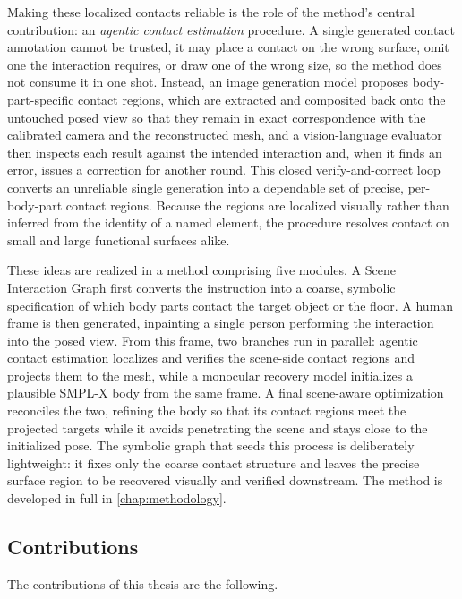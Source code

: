 Making these localized contacts reliable is the role of the method's central contribution: an \emph{agentic contact estimation} procedure. A single generated contact annotation cannot be trusted, it may place a contact on the wrong surface, omit one the interaction requires, or draw one of the wrong size, so the method does not consume it in one shot. Instead, an image generation model proposes body-part-specific contact regions, which are extracted and composited back onto the untouched posed view so that they remain in exact correspondence with the calibrated camera and the reconstructed mesh, and a vision-language evaluator then inspects each result against the intended interaction and, when it finds an error, issues a correction for another round. This closed verify-and-correct loop converts an unreliable single generation into a dependable set of precise, per-body-part contact regions. Because the regions are localized visually rather than inferred from the identity of a named element, the procedure resolves contact on small and large functional surfaces alike.

These ideas are realized in a method comprising five modules. A Scene Interaction Graph first converts the instruction into a coarse, symbolic specification of which body parts contact the target object or the floor. A human frame is then generated, inpainting a single person performing the interaction into the posed view. From this frame, two branches run in parallel: agentic contact estimation localizes and verifies the scene-side contact regions and projects them to the mesh, while a monocular recovery model initializes a plausible SMPL-X body from the same frame. A final scene-aware optimization reconciles the two, refining the body so that its contact regions meet the projected targets while it avoids penetrating the scene and stays close to the initialized pose. The symbolic graph that seeds this process is deliberately lightweight: it fixes only the coarse contact structure and leaves the precise surface region to be recovered visually and verified downstream. The method is developed in full in \cref{chap:methodology}.

\subsection{Contributions}
\label{sec:intro-contributions}

The contributions of this thesis are the following.

